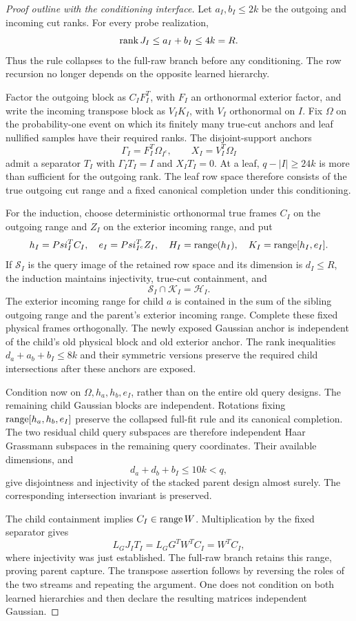 \documentclass[11pt,oneside,openany,a4paper]{report}
\numberwithin{equation}{chapter}
\theoremstyle{definition}
\theoremstyle{remark}
\begin{document}
\begin{proof}[Proof outline with the conditioning interface]
Let $a_I,b_I\leq2k$ be the outgoing and incoming cut ranks.  For every
probe realization,
\[
 \operatorname{rank} J_I\leq a_I+b_I\leq4k=R.
\]
Thus the rule collapses to the full-raw branch before any conditioning.
The row recursion no longer depends on the opposite learned hierarchy.

Factor the outgoing block as $C_IF_I^T$, with $F_I$ an orthonormal
exterior factor, and write the incoming transpose block as $V_IK_I$,
with $V_I$ orthonormal on $I$.  Fix $\Omega$ on the probability-one
event on which its finitely many true-cut anchors and leaf nullified
samples have their required ranks.  The disjoint-support anchors
\[
 \Gamma_I=F_I^T\Omega_{I^c},\qquad X_I=V_I^T\Omega_I
\]
admit a separator $T_I$ with $\Gamma_IT_I=I$ and $X_IT_I=0$.
At a leaf, $q-|I|\geq24k$ is more than sufficient for the outgoing
rank.  The leaf row space therefore consists of the true outgoing cut
range and a fixed canonical completion under this conditioning.

For the induction, choose deterministic orthonormal true frames $C_I$
on the outgoing range and $Z_I$ on the exterior incoming range, and put
\[
 h_I=Psi_I^TC_I,\quad e_I=Psi_{I^c}^TZ_I,
 \quad H_I=\operatorname{range}(h_I),\quad
 K_I=\operatorname{range}[h_I,e_I].
\]
If $\mathcal S_I$ is the query image of the retained row space and its
dimension is $d_I\leq R$, the induction maintains injectivity,
true-cut containment, and
\[
 \mathcal S_I\cap\mathcal K_I=\mathcal H_I.
\]
The exterior incoming range for child $a$ is contained in the sum of
the sibling outgoing range and the parent's exterior incoming range.
Complete these fixed physical frames orthogonally.  The newly exposed
Gaussian anchor is independent of the child's old physical block and
old exterior anchor.  The rank inequalities
$d_a+a_b+b_I\leq8k$ and their symmetric versions preserve the required
child intersections after these anchors are exposed.

Condition now on $\Omega,h_a,h_b,e_I$, rather than on the entire old
query designs.  The remaining child Gaussian blocks are independent.
Rotations fixing $\operatorname{range}[h_a,h_b,e_I]$ preserve the collapsed full-fit
rule and its canonical completion.  The two residual child query
subspaces are therefore independent Haar Grassmann subspaces in the
remaining query coordinates.  Their available dimensions, and
\[
 d_a+d_b+b_I\leq10k<q,
\]
give disjointness and injectivity of the stacked parent design almost
surely.  The corresponding intersection invariant is preserved.

The child containment implies $C_I\in\operatorname{range} W$.  Multiplication by the
fixed separator gives
\[
 L_GJ_IT_I=L_GG^TW^TC_I=W^TC_I,
\]
where injectivity was just established.  The full-raw branch retains
this range, proving parent capture.  The transpose assertion follows
by reversing the roles of the two streams and repeating the argument.
One does not condition on both learned hierarchies and then declare
the resulting matrices independent Gaussian.
\end{proof}
\end{document}
